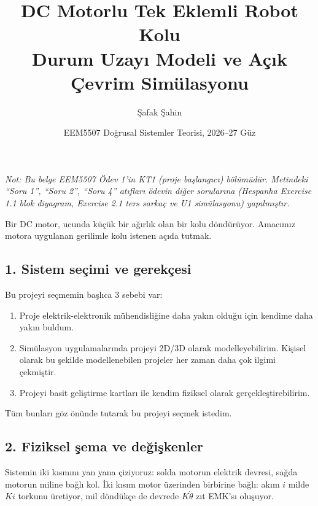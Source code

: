 \documentclass[11pt,a4paper]{article}
\title{DC Motorlu Tek Eklemli Robot Kolu\\[2pt] \large Durum Uzayı Modeli ve Açık Çevrim Simülasyonu}
\author{Şafak Şahin}
\date{EEM5507 Doğrusal Sistemler Teorisi, 2026--27 Güz}
\begin{document}
\maketitle

\noindent\textit{Not: Bu belge EEM5507 Ödev 1'in KT1 (proje başlangıcı) bölümüdür. Metindeki ``Soru 1'', ``Soru 2'', ``Soru 4'' atıfları ödevin diğer sorularına (Hespanha Exercise 1.1 blok diyagram, Exercise 2.1 ters sarkaç ve U1 simülasyonu) yapılmıştır.}


Bir DC motor, ucunda küçük bir ağırlık olan bir kolu döndürüyor. Amacımız motora uygulanan gerilimle kolu istenen açıda tutmak.

\subsection*{1. Sistem seçimi ve gerekçesi}
Bu projeyi seçmemin başlıca 3 sebebi var:
\begin{enumerate}
\item Proje elektrik-elektronik mühendisliğine daha yakın olduğu için kendime daha yakın buldum.
\item Simülasyon uygulamalarında projeyi 2D/3D olarak modelleyebilirim. Kişisel olarak bu şekilde modellenebilen projeler her zaman daha çok ilgimi çekmiştir.
\item Projeyi basit geliştirme kartları ile kendim fiziksel olarak gerçekleştirebilirim.
\end{enumerate}
Tüm bunları göz önünde tutarak bu projeyi seçmek istedim.

\subsection*{2. Fiziksel şema ve değişkenler}
Sistemin iki kısmını yan yana çiziyoruz: solda motorun elektrik devresi, sağda motorun miline bağlı kol. İki kısım motor üzerinden birbirine bağlı: akım $i$ milde $K i$ torkunu üretiyor, mil döndükçe de devrede $K\dot\theta$ zıt EMK'sı oluşuyor.
\end{document}
